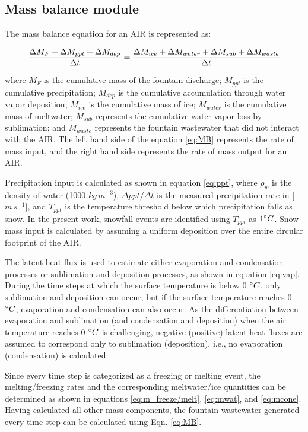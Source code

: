 \subsection{Mass balance module}

The mass balance equation for an \ac{AIR} is represented as:

\begin{equation}
	\frac{\Delta M_{F} + \Delta M_{ppt} + \Delta M_{dep}}{\Delta t} = \frac{\Delta M_{ice} +\Delta M_{water} +
		\Delta M_{sub} + \Delta M_{waste}}{\Delta t}  \\
	\label{eq:MB}
\end{equation}

where $M_{F}$ is the cumulative mass of the fountain discharge; $M_{ppt}$ is the cumulative precipitation; $M_{dep}$ is the cumulative
accumulation through water vapor deposition; $M_{ice}$ is the cumulative mass of ice; $M_{water}$ is the cumulative
mass of meltwater; $M_{sub}$ represents the cumulative water vapor loss by sublimation; and $M_{waste}$ represents the
fountain wastewater that did not interact with the \ac{AIR}. The left hand side of the equation \ref{eq:MB} represents the rate of
mass input, and the right hand side represents the rate of mass output for an \ac{AIR}.

Precipitation input is calculated as shown in equation \ref{eq:ppt}, where $\rho_{w}$ is the density of water (1000
$kg\,m^{-3}$), $\Delta ppt/ \Delta t$ is the measured precipitation rate in [$m\,s^{-1}$], and $T_{ppt}$ is the temperature threshold
below which precipitation falls as snow. In the present work, snowfall events are identified using $T_{ppt}$ as $1 ^{\circ} C$. Snow
mass input is calculated by assuming a uniform deposition over the entire circular footprint of the \ac{AIR}.

The latent heat flux is used to estimate either evaporation and condensation processes or sublimation and
deposition processes, as shown in equation \ref{eq:vap}. During the time steps at which the surface temperature
is below 0 $^{\circ} C$, only sublimation and deposition can occur; but if the surface temperature reaches 0
$^{\circ} C$, evaporation and condensation can also occur. As the differentiation between evaporation and
sublimation (and condensation and deposition) when the air temperature reaches 0 $^{\circ} C$ is challenging,
negative (positive) latent heat fluxes are assumed to correspond only to sublimation (deposition), i.e., no
evaporation (condensation) is calculated.

Since every time step is categorized as a freezing or melting event, the melting/freezing rates and the
corresponding meltwater/ice quantities can be determined as shown in equations \ref{eq:m_freeze/melt},
\ref{eq:mwat}, and \ref{eq:mcone}. Having calculated all other mass components, the fountain wastewater generated
every time step can be calculated using Eqn. \ref{eq:MB}.

